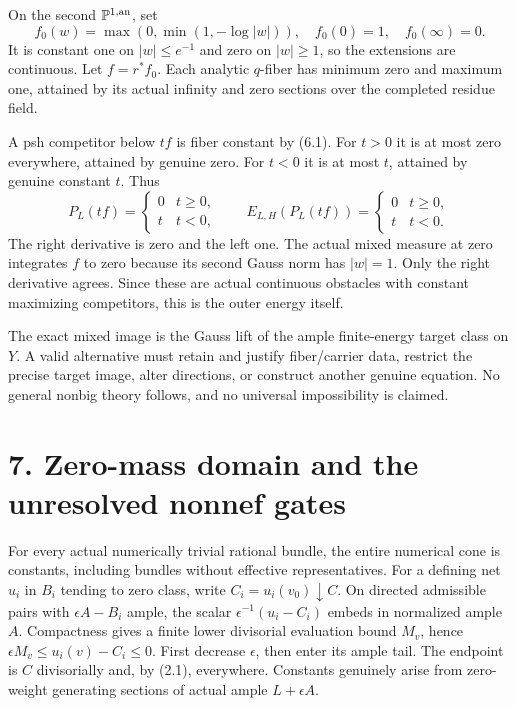 \documentclass[
  10pt,
]{article}
\begin{document}
On the second \(\mathbb P^{1,\rm an}\), set
\[f_0(w)=\max(0,\min(1,-\log|w|)),\quad f_0(0)=1,\quad f_0(\infty)=0.\]
It is constant one on \(|w|\le e^{-1}\) and zero on \(|w|\ge1\), so the
extensions are continuous. Let \(f=r^*f_0\). Each analytic \(q\)-fiber
has minimum zero and maximum one, attained by its actual infinity and
zero sections over the completed residue field.

A psh competitor below \(tf\) is fiber constant by (6.1). For \(t>0\) it
is at most zero everywhere, attained by genuine zero. For \(t<0\) it is
at most \(t\), attained by genuine constant \(t\). Thus
\[P_L(tf)=\begin{cases}0&t\ge0,\\ t&t<0,\end{cases}\qquad
E_{L,H}(P_L(tf))=\begin{cases}0&t\ge0,\\ t&t<0.\end{cases} \tag{6.8}\]
The right derivative is zero and the left one. The actual mixed measure
at zero integrates \(f\) to zero because its second Gauss norm has
\(|w|=1\). Only the right derivative agrees. Since these are actual
continuous obstacles with constant maximizing competitors, this is the
outer energy itself.

The exact mixed image is the Gauss lift of the ample finite-energy
target class on \(Y\). A valid alternative must retain and justify
fiber/carrier data, restrict the precise target image, alter directions,
or construct another genuine equation. No general nonbig theory follows,
and no universal impossibility is claimed.

\section{7. Zero-mass domain and the unresolved nonnef
gates}\label{zero-mass-domain-and-the-unresolved-nonnef-gates}

For every actual numerically trivial rational bundle, the entire
numerical cone is constants, including bundles without effective
representatives. For a defining net \(u_i\) in \(B_i\) tending to zero
class, write \(C_i=u_i(v_0)\downarrow C\). On directed admissible pairs
with \(\epsilon A-B_i\) ample, the scalar \(\epsilon^{-1}(u_i-C_i)\)
embeds in normalized ample \(A\). Compactness gives a finite lower
divisorial evaluation bound \(M_v\), hence
\(\epsilon M_v\le u_i(v)-C_i\le0\). First decrease \(\epsilon\), then
enter its ample tail. The endpoint is \(C\) divisorially and, by (2.1),
everywhere. Constants genuinely arise from zero-weight generating
sections of actual ample \(L+\epsilon A\).
\end{document}
